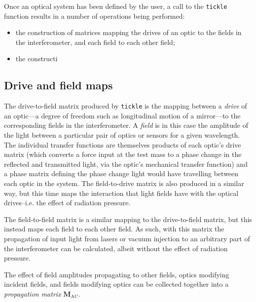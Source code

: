Once an optical system has been defined by the user, a call to the \lstinline{tickle} function results in a number of operations being performed:
\begin{itemize}
  \item the construction of matrices mapping the drives of an optic to the fields in the interferometer, and each field to each other field;
  \item the constructi
\end{itemize}

\subsection{Drive and field maps}
The drive-to-field matrix produced by \lstinline{tickle} is the mapping between a \emph{drive} of an optic---a degree of freedom such as longitudinal motion of a mirror---to the corresponding fields in the interferometer. A \emph{field} is in this case the amplitude of the light between a particular pair of optics or sensors for a given wavelength. The individual transfer functions are themselves products of each optic's drive matrix (which converts a force input at the test mass to a phase change in the reflected and transmitted light, via the optic's mechanical transfer function) and a phase matrix defining the phase change light would have travelling between each optic in the system. The field-to-drive matrix is also produced in a similar way, but this time maps the interaction that light fields have with the optical drives--i.e. the effect of radiation pressure.

The field-to-field matrix is a similar mapping to the drive-to-field matrix, but this instead maps each field to each other field. As such, with this matrix the propagation of input light from lasers or vacuum injection to an arbitrary part of the interferometer can be calculated, albeit without the effect of radiation pressure.

The effect of field amplitudes propagating to other fields, optics modifying incident fields, and fields modifying optics can be collected together into a \emph{propagation matrix} $\mathbf{M}_{\text{AC}}$.

